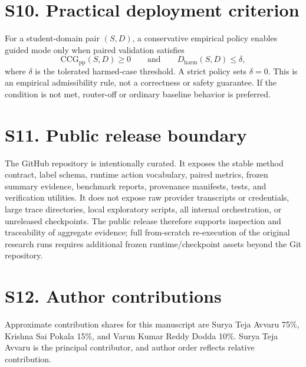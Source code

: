 \documentclass[11pt]{article}
\begin{document}
\section*{S10. Practical deployment criterion}
For a student-domain pair \((S,D)\), a conservative empirical policy enables guided mode only when paired validation satisfies
\[
\mathrm{CCG}_{\mathrm{pp}}(S,D)\ge 0
\qquad\text{and}\qquad
D_{\mathrm{harm}}(S,D)\le \delta,
\]
where \(\delta\) is the tolerated harmed-case threshold. A strict policy sets \(\delta=0\). This is an empirical admissibility rule, not a correctness or safety guarantee. If the condition is not met, router-off or ordinary baseline behavior is preferred.

\section*{S11. Public release boundary}
The GitHub repository is intentionally curated. It exposes the stable method contract, label schema, runtime action vocabulary, paired metrics, frozen summary evidence, benchmark reports, provenance manifests, tests, and verification utilities. It does not expose raw provider transcripts or credentials, large trace directories, local exploratory scripts, all internal orchestration, or unreleased checkpoints. The public release therefore supports inspection and traceability of aggregate evidence; full from-scratch re-execution of the original research runs requires additional frozen runtime/checkpoint assets beyond the Git repository.

\section*{S12. Author contributions}
Approximate contribution shares for this manuscript are Surya Teja Avvaru 75\%, Krishna Sai Pokala 15\%, and Varun Kumar Reddy Dodda 10\%. Surya Teja Avvaru is the principal contributor, and author order reflects relative contribution.
\end{document}
